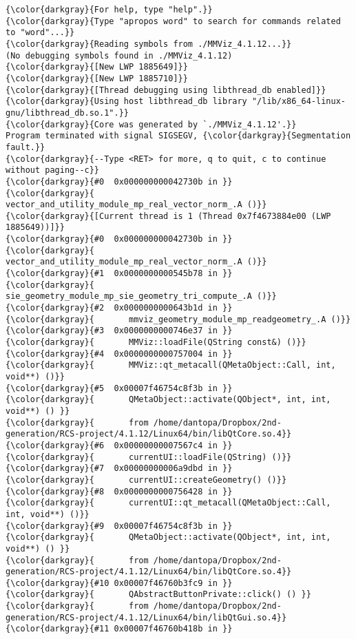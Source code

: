 {{\begin{Verbatim}[commandchars=\\\{\}]
{\color{darkgray}{For help, type "help".}}
{\color{darkgray}{Type "apropos word" to search for commands related to "word"...}}
{\color{darkgray}{Reading symbols from ./MMViz_4.1.12...}}
(No debugging symbols found in ./MMViz_4.1.12)
{\color{darkgray}{[New LWP 1885649]}}
{\color{darkgray}{[New LWP 1885710]}}
{\color{darkgray}{[Thread debugging using libthread_db enabled]}}
{\color{darkgray}{Using host libthread_db library "/lib/x86_64-linux-gnu/libthread_db.so.1".}}
{\color{darkgray}{Core was generated by `./MMViz_4.1.12'.}}
Program terminated with signal SIGSEGV, {\color{darkgray}{Segmentation fault.}}
{\color{darkgray}{--Type <RET> for more, q to quit, c to continue without paging--c}}
{\color{darkgray}{#0  0x000000000042730b in }}
{\color{darkgray}{       vector_and_utility_module_mp_real_vector_norm_.A ()}}
{\color{darkgray}{[Current thread is 1 (Thread 0x7f4673884e00 (LWP 1885649))]}}
{\color{darkgray}{#0  0x000000000042730b in }}
{\color{darkgray}{       vector_and_utility_module_mp_real_vector_norm_.A ()}}
{\color{darkgray}{#1  0x0000000000545b78 in }}
{\color{darkgray}{       sie_geometry_module_mp_sie_geometry_tri_compute_.A ()}}
{\color{darkgray}{#2  0x0000000000643b1d in }}
{\color{darkgray}{       mmviz_geometry_module_mp_readgeometry_.A ()}}
{\color{darkgray}{#3  0x0000000000746e37 in }}
{\color{darkgray}{       MMViz::loadFile(QString const&) ()}}
{\color{darkgray}{#4  0x0000000000757004 in }}
{\color{darkgray}{       MMViz::qt_metacall(QMetaObject::Call, int, void**) ()}}
{\color{darkgray}{#5  0x00007f46754c8f3b in }}
{\color{darkgray}{       QMetaObject::activate(QObject*, int, int, void**) () }}
{\color{darkgray}{       from /home/dantopa/Dropbox/2nd-generation/RCS-project/4.1.12/Linux64/bin/libQtCore.so.4}}
{\color{darkgray}{#6  0x00000000007567c4 in }}
{\color{darkgray}{       currentUI::loadFile(QString) ()}}
{\color{darkgray}{#7  0x00000000006a9dbd in }}
{\color{darkgray}{       currentUI::createGeometry() ()}}
{\color{darkgray}{#8  0x0000000000756428 in }}
{\color{darkgray}{       currentUI::qt_metacall(QMetaObject::Call, int, void**) ()}}
{\color{darkgray}{#9  0x00007f46754c8f3b in }}
{\color{darkgray}{       QMetaObject::activate(QObject*, int, int, void**) () }}
{\color{darkgray}{       from /home/dantopa/Dropbox/2nd-generation/RCS-project/4.1.12/Linux64/bin/libQtCore.so.4}}
{\color{darkgray}{#10 0x00007f46760b3fc9 in }}
{\color{darkgray}{       QAbstractButtonPrivate::click() () }}
{\color{darkgray}{       from /home/dantopa/Dropbox/2nd-generation/RCS-project/4.1.12/Linux64/bin/libQtGui.so.4}}
{\color{darkgray}{#11 0x00007f46760b418b in }}

\end{Verbatim}}}
